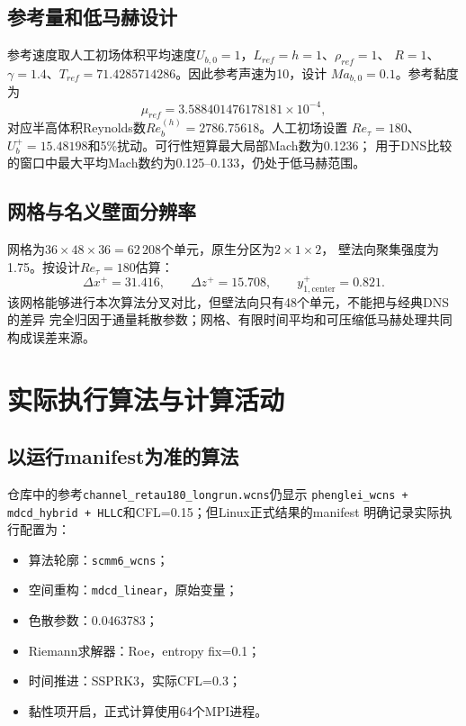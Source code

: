 \documentclass[UTF8,12pt,a4paper,fontset=fandol]{ctexart}
\newcommand{\Retau}{Re_{\tau}}
\newcommand{\code}[1]{\texttt{#1}}
\begin{document}
\subsection{参考量和低马赫设计}

参考速度取人工初场体积平均速度$U_{b,0}=1$，$L_{ref}=h=1$、$\rho_{ref}=1$、
$R=1$、$\gamma=1.4$、$T_{ref}=71.4285714286$。因此参考声速为10，设计
$Ma_{b,0}=0.1$。参考黏度为
\begin{equation}
  \mu_{ref}=3.588401476178181\times10^{-4},
\end{equation}
对应半高体积Reynolds数$Re_b^{(h)}=2786.75618$。人工初场设置
$\Retau=180$、$U_b^+=15.48198$和5\%扰动。可行性短算最大局部Mach数为0.1236；
用于DNS比较的窗口中最大平均Mach数约为0.125--0.133，仍处于低马赫范围。

\subsection{网格与名义壁面分辨率}

网格为$36\times48\times36=62\,208$个单元，原生分区为$2\times1\times2$，
壁法向聚集强度为1.75。按设计$\Retau=180$估算：
\begin{equation}
  \Delta x^+=31.416,\qquad \Delta z^+=15.708,\qquad
  y^+_{1,\mathrm{center}}=0.821 .
\end{equation}
该网格能够进行本次算法分叉对比，但壁法向只有48个单元，不能把与经典DNS的差异
完全归因于通量耗散参数；网格、有限时间平均和可压缩低马赫处理共同构成误差来源。

\section{实际执行算法与计算活动}

\subsection{以运行manifest为准的算法}

仓库中的参考\code{channel\_retau180\_longrun.wcns}仍显示
\code{phenglei\_wcns + mdcd\_hybrid + HLLC}和CFL=0.15；但Linux正式结果的manifest
明确记录实际执行配置为：

\begin{itemize}
  \item 算法轮廓：\code{scmm6\_wcns}；
  \item 空间重构：\code{mdcd\_linear}，原始变量；
  \item 色散参数：0.0463783；
  \item Riemann求解器：Roe，entropy fix=0.1；
  \item 时间推进：SSPRK3，实际CFL=0.3；
  \item 黏性项开启，正式计算使用64个MPI进程。
\end{itemize}
\end{document}
